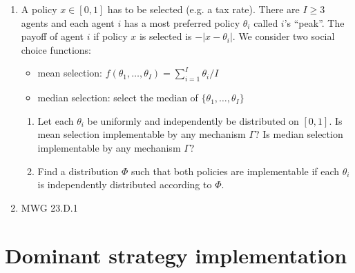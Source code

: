 \documentclass[a4paper,12pt]{article}
\begin{document}
\begin{enumerate}
\item A policy $x\in[0,1]$ has to be selected (e.g. a tax rate). There are $I\geq 3$ agents and each agent $i$ has a most preferred policy $\theta _i$ called $i$'s ``peak''. The payoff of agent $i$ if policy $x$ is selected is $-|x-\theta _i|$. We consider two social choice functions:
  \begin{itemize}
  \item mean selection: $f(\theta _1,\dots,\theta _I)=\sum_{i=1}^I\theta _i/I$
    \item median selection: select the median of $\{\theta_1,\dots,\theta_I\}$
  \end{itemize}
  \begin{enumerate}
  \item Let each $\theta _i$ be uniformly and independently be distributed on $[0,1]$. Is mean selection implementable by any mechanism $\Gamma$? Is median selection implementable by any mechanism $\Gamma$?
    \item Find a distribution $\Phi$ such that both policies are implementable if each $\theta _i$ is independently distributed according to $\Phi$.
    \end{enumerate}
    \item MWG 23.D.1
    \end{enumerate}

\section{Dominant strategy implementation}
\label{sec:domin-strat-impl}
\end{document}
